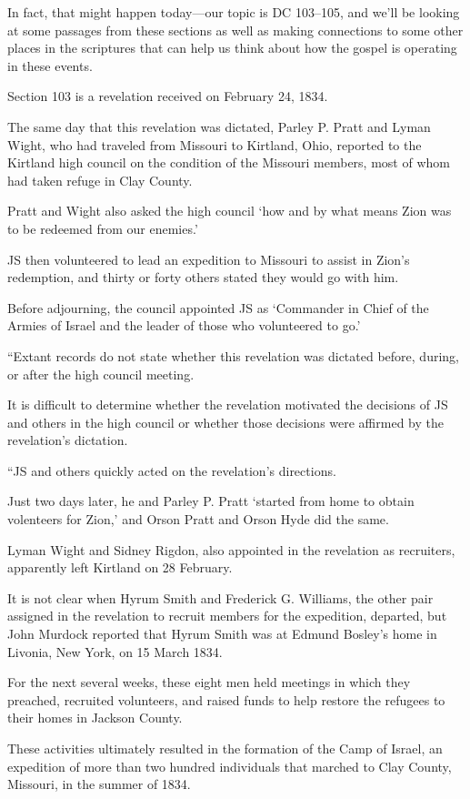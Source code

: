 \begin{compactitem}
			\item In fact, that might happen today---our topic is DC 103--105, and we'll be looking at some passages from these sections as well as making connections to some other places in the scriptures that can help us think about how the gospel is operating in these events.
				\begin{compactitem}
					\item Section 103 is a revelation received on February 24, 1834. 
					\item The same day that this revelation was dictated, Parley P. Pratt and Lyman Wight, who had traveled from Missouri to Kirtland, Ohio, reported to the Kirtland high council on the condition of the Missouri members, most of whom had taken refuge in Clay County.
					\item Pratt and Wight also asked the high council ‘how and by what means Zion was to be redeemed from our enemies.’
					\item JS then volunteered to lead an expedition to Missouri to assist in Zion’s redemption, and thirty or forty others stated they would go with him.
					\item Before adjourning, the council appointed JS as ‘Commander in Chief of the Armies of Israel and the leader of those who volunteered to go.’
					\item ``Extant records do not state whether this revelation was dictated before, during, or after the high council meeting.
					\item It is difficult to determine whether the revelation motivated the decisions of JS and others in the high council or whether those decisions were affirmed by the revelation’s dictation.
					\item ``JS and others quickly acted on the revelation’s directions.
					\item Just two days later, he and Parley P. Pratt ‘started from home to obtain volenteers for Zion,’ and Orson Pratt and Orson Hyde did the same.
					\item Lyman Wight and Sidney Rigdon, also appointed in the revelation as recruiters, apparently left Kirtland on 28 February.
					\item It is not clear when Hyrum Smith and Frederick G. Williams, the other pair assigned in the revelation to recruit members for the expedition, departed, but John Murdock reported that Hyrum Smith was at Edmund Bosley’s home in Livonia, New York, on 15 March 1834.
					\item For the next several weeks, these eight men held meetings in which they preached, recruited volunteers, and raised funds to help restore the refugees to their homes in Jackson County.
					\item These activities ultimately resulted in the formation of the Camp of Israel, an expedition of more than two hundred individuals that marched to Clay County, Missouri, in the summer of 1834. 
				\end{compactitem}
				

\end{compactitem}
